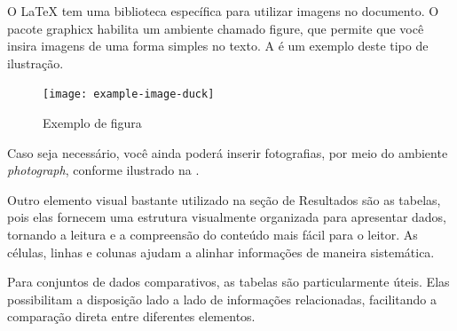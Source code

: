 O LaTeX tem uma biblioteca específica para utilizar imagens no documento. O pacote graphicx habilita um ambiente chamado figure, que permite que você insira imagens de uma forma simples no texto. A  é um exemplo deste tipo de ilustração.

\begin{figure}[!h]
\centering
\caption{Exemplo de figura}%
\label{fig:example-image-duck}
\texttt{[image: example-image-duck]}
\end{figure}

Caso seja necessário, você ainda poderá inserir fotografias, por meio do ambiente \textit{photograph}, conforme ilustrado na .

\begin{photograph}[!h]
\centering
{}
\caption{Fachada da Fatec de Registro}%
\label{phot:pg-campus}
%
\end{photograph}

Outro elemento visual bastante utilizado na seção de Resultados são as tabelas, pois elas fornecem uma estrutura visualmente organizada para apresentar dados, tornando a leitura e a compreensão do conteúdo mais fácil para o leitor. As células, linhas e colunas ajudam a alinhar informações de maneira sistemática.

Para conjuntos de dados comparativos, as tabelas são particularmente úteis. Elas possibilitam a disposição lado a lado de informações relacionadas, facilitando a comparação direta entre diferentes elementos.

